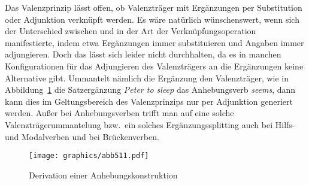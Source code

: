Das Valenzprinzip lässt offen, ob Valenzträger mit Ergänzungen per Substitution oder Adjunktion verknüpft werden. Es wäre natürlich wünschenswert, wenn sich der Unterschied zwischen  und  in der Art der Verknüpfungsoperation manifestierte, indem etwa Ergänzungen immer substituieren und Angaben immer adjungieren. Doch das lässt sich leider nicht durchhalten, da es in manchen Konfigurationen für das Adjungieren des Valenzträgers an die Ergänzungen keine Alternative gibt. Ummantelt nämlich die Ergänzung den Valenzträger, wie in Abbildung~\ref{fig-TAG-raising} die Satzergänzung {\it Peter to sleep} das Anhebungsverb {\it seems}, dann kann dies im Geltungsbereich des Valenzprinzips nur per Adjunktion generiert werden. Au\ss er bei Anhebungsverben trifft man auf eine solche Valenzträgerummantelung bzw.\ ein solches Ergänzungssplitting auch bei Hilfs- und Modalverben und bei Brückenverben.

\begin{figure}[t]
\centering
\texttt{[image: graphics/abb511.pdf]}
\caption{\label{fig-TAG-raising}Derivation einer Anhebungskonstruktion}
\end{figure}

